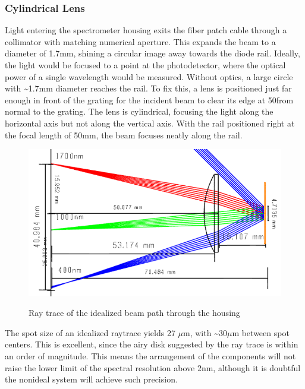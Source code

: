 \documentclass[journal]{IEEEtran}
\begin{document}
\subsubsection{Cylindrical Lens}
Light entering the spectrometer housing exits the fiber patch cable through a collimator with matching numerical aperture. This expands the beam to a diameter of 1.7mm, shining a circular image away towards the diode rail. Ideally, the light would be focused to a point at the photodetector, where the optical power of a single wavelength would be measured. Without optics, a large circle with \~{}1.7mm diameter reaches the rail. To fix this, a lens is positioned just far enough in front of the grating for the incident beam to clear its edge at 50\textdegree from normal to the grating. The lens is cylindrical, focusing the light along the horizontal axis but not along the vertical axis. With the rail positioned right at the focal length of 50mm, the beam focuses neatly along the rail.
\begin{figure}[H]
    \centering
    \includegraphics[width=\linewidth]{images/RayTrace.png}
    \label{fig:housing-ray-trace}
    \caption{Ray trace of the idealized beam path through the housing}
\end{figure}
The spot size of an idealized raytrace yields 27 $\mu $m, with \~{}30$\mu $m between spot centers. This is excellent, since the airy disk suggested by the ray trace is within an order of magnitude. This means the arrangement of the components will not raise the lower limit of the spectral resolution above 2nm, although it is doubtful the nonideal system will achieve such precision. 
\end{document}
